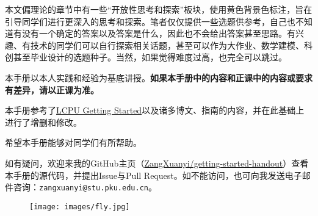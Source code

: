 \documentclass[../main.tex]{subfiles}
\begin{document}
本文偏理论的章节中有一些“开放性思考和探索”板块，使用黄色背景色标注，旨在引导同学们进行更深入的思考和探索。笔者仅仅提供一些选题供参考，自己也不知道有没有一个确定的答案以及答案是什么，因此也不会给出答案甚至思路。有兴趣、有技术的同学们可以自行探索相关话题，甚至可以作为大作业、数学建模、科创甚至毕业设计的选题种子。当然，如果觉得难度过高，也完全可以跳过。

本手册以本人实践和经验为基底讲授。\textbf{如果本手册中的内容和正课中的内容或要求有差异，请以正课为准。}

本手册参考了\href{https://missing.lcpu.dev}{LCPU Getting Started}以及诸多博文、指南的内容，并在此基础上进行了增删和修改。

希望本手册能够对同学们有所帮助。

如有疑问，欢迎来我的GitHub主页（\faGithub\href{https://github.com/ZangXuanyi/getting-started-handout}{ZangXuanyi/getting-started-handout}）查看本手册的源代码，并提出Issue与Pull Request。如不能访问，也可向我发送电子邮件咨询：\texttt{zangxuanyi@stu.pku.edu.cn}。

\begin{figure}[ht]
  \centering
  \texttt{[image: images/fly.jpg]}
\end{figure}
\end{document}
